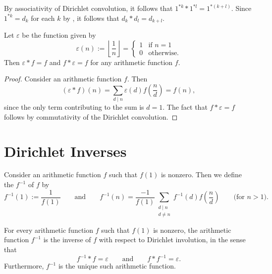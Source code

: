 \begin{example}
  By associativity of Dirichlet convolution, it follows that $1^{\ast k}\ast 1^{\ast l}=1^{\ast(k+l)}$. Since $1^{\ast k}=d_k$ for each $k$ by , it follows that $d_k\ast d_l=d_{k+l}$.
\end{example}

\begin{theorem}
  Let $\varepsilon$ be the function given by
  \begin{equation*}
    \varepsilon(n):=\left\lfloor\frac{1}{n}\right\rfloor=
    \begin{cases}
      1 & \text{if }n=1 \\
      0 & \text{otherwise.}
    \end{cases}
  \end{equation*}
  Then $\varepsilon\ast f=f$ and $f\ast\varepsilon=f$ for any arithmetic function $f$.
\end{theorem}

\begin{proof}
  Consider an arithmetic function $f$. Then
  \begin{equation*}
    (\varepsilon\ast f)(n)=\sum_{d\mid n}\varepsilon(d)f\left(\frac{n}{d}\right)=f(n),
  \end{equation*}
  since the only term contributing to the sum is $d=1$. The fact that $f\ast\varepsilon=f$ follows by commutativity of the Dirichlet convolution.
\end{proof}

\section{Dirichlet Inverses}

\begin{definition}
  Consider an arithmetic function $f$ such that $f(1)$ is nonzero. Then we define the  $f^{-1}$ of $f$ by
  \begin{equation*}
    f^{-1}(1) := \frac{1}{f(1)}\qquad\text{and}\qquad f^{-1}(n)=\frac{-1}{f(1)}\sum_{\substack{d\mid n \\ d\neq n}}f^{-1}(d)f\left(\frac{n}{d}\right)\qquad \text{(for $n>1$)}.
  \end{equation*}
\end{definition}

\begin{theorem}
  For every arithmetic function $f$ such that $f(1)$ is nonzero, the arithmetic function $f^{-1}$ is the inverse of $f$ with respect to Dirichlet involution, in the sense that
  \begin{equation*}
    f^{-1}\ast f=\varepsilon\qquad\text{and}\qquad f\ast f^{-1}=\varepsilon.
  \end{equation*}
  Furthermore, $f^{-1}$ is the unique such arithmetic function.
\end{theorem}

